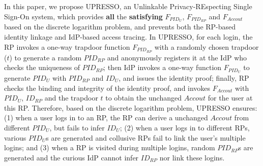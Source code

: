 In this paper, we propose UPRESSO, an Unlinkable Privacy-REspecting Single Sign-On system,
which provides \textbf{all} the \textbf{satisfying} $F_{PID_{U}}$, $F_{PID_{RP}}$ and $F_{Accout}$ based on the discrete logarithm problem, and prevents both the RP-based identity linkage and IdP-based access tracing.
In UPRESSO, for each login, the RP invokes a one-way trapdoor function $F_{PID_{RP}}$ with a randomly chosen trapdoor ($t$) to generate a random $PID_{RP}$ and anonymously registers it at the IdP who checks the uniqueness of $PID_{RP}$;
then IdP invokes a one-way function  $F_{PID_{U}}$ to generate $PID_U$ with $PID_{RP}$ and $ID_U$, and issues the identity proof;
finally, RP checks the binding and integrity of the identity proof, and invokes $F_{Accout}$ with $PID_U$, $ID_{RP}$ and the trapdoor $t$ to obtain the unchanged $Accout$ for the user at this RP.
Therefore, based on the discrete logarithm problem,
 UPRESSO ensures:
 (1) when a  user logs in to an RP, the RP can derive a unchanged $Accout$ from different $PID_U$, but fails to infer $ID_U$;
 (2) when a user logs in to different RPs, various $PID_U$s are generated and collusive RPs fail to link the user's multiple logins;
 and (3) when a RP is visited during multiple logins, random $PID_{RP}$s are generated and the curious IdP cannot infer $ID_{RP}$ nor link these logins.






